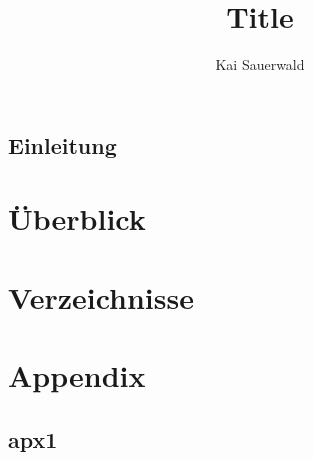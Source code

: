 \documentclass[fontsize=11pt,a4paper,toc=bibliography,listof=totoc,BCOR=10mm,pdftex]{scrreprt}
\title{Title
	}
\author{Kai Sauerwald}
\begin{document}
\maketitle %


\tableofcontents

\cleardoublepage %
\setcounter{page}{1} %

\chapter{Einleitung} \label{chap:introduction}
%

\part{Überblick}  \label{part:overview}

\part{Verzeichnisse}




\listoffigures
{}

\appendix
\part{Appendix}
\renewcommand{\thetheoCounter}{\Alph{chapter}.\arabic{theoCounter}}
\chapter{apx1}  \label{chap:apx:documentation}
\end{document}
